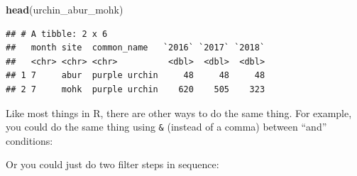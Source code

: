 \documentclass[]{book}
\newenvironment{Shaded}{\begin{snugshade}}{\end{snugshade}}
\newcommand{\CommentTok}[1]{\textcolor[rgb]{0.56,0.35,0.01}{\textit{#1}}}
\newcommand{\KeywordTok}[1]{\textcolor[rgb]{0.13,0.29,0.53}{\textbf{#1}}}
\newcommand{\NormalTok}[1]{#1}
\newcommand{\OperatorTok}[1]{\textcolor[rgb]{0.81,0.36,0.00}{\textbf{#1}}}
\newcommand{\StringTok}[1]{\textcolor[rgb]{0.31,0.60,0.02}{#1}}
\begin{document}
\begin{Shaded}
\end{Shaded}

\begin{Shaded}
\begin{Highlighting}[]
\KeywordTok{head}\NormalTok{(urchin_abur_mohk)}
\end{Highlighting}
\end{Shaded}

\begin{verbatim}
## # A tibble: 2 x 6
##   month site  common_name   `2016` `2017` `2018`
##   <chr> <chr> <chr>          <dbl>  <dbl>  <dbl>
## 1 7     abur  purple urchin     48     48     48
## 2 7     mohk  purple urchin    620    505    323
\end{verbatim}

Like most things in R, there are other ways to do the same thing. For example, you could do the same thing using \texttt{\&} (instead of a comma) between ``and'' conditions:

\begin{Shaded}
\end{Shaded}

Or you could just do two filter steps in sequence:

\begin{Shaded}
\end{Shaded}
\end{document}
